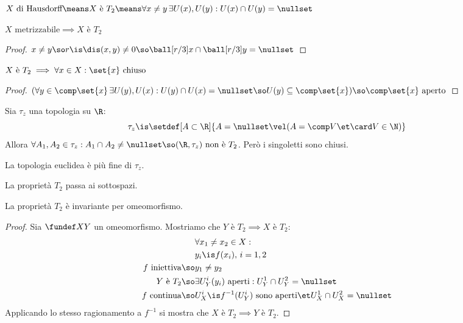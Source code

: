 
\begin{defn}
$X\text{ di Hausdorff}\means X\text{ è }T_2\means\forall x\neq y\,\exists U(x),U(y):U(x)\cap U(y)=\nullset$
\end{defn}

\begin{prop}
$X\text{ metrizzabile}\implies X\text{ è }T_2$
\end{prop}
\begin{proof}
$x\neq y\so r\is\dis(x,y)\neq 0\so\ball[r/3]x\cap\ball[r/3]y=\nullset$
\end{proof}

\begin{prop}
$X\text{ è }T_2\implies\forall x\in X:\set{x}\text{ chiuso}$
\end{prop}
\begin{proof}
$(\forall y\in\comp\set{x}\,\exists U(y),U(x):U(y)\cap U(x)=\nullset\so U(y)\subseteq\comp\set{x})\so\comp\set{x}\text{ aperto}$
\end{proof}

\begin{es}
Sia $\tau_z$ una topologia su $\R$:
\[\tau_z\is\setdef[A\subset\R]{A=\nullset\vel(A=\comp V\et\card V\in\N)}\]
Allora $\forall A_1,A_2\in\tau_z:A_1\cap A_2\neq\nullset\so(\R,\tau_z)\text{ non è }T_2$. Però i singoletti sono chiusi.
\end{es}

\begin{oss}
La topologia euclidea è più fine di $\tau_z$.
\end{oss}

\begin{prop}
La proprietà $T_2$ passa ai sottospazi.
\end{prop}

\begin{prop}
La proprietà $T_2$ è invariante per omeomorfismo.
\end{prop}
\begin{proof}
Sia $\fundef XY$ un omeomorfismo. Mostriamo che $Y\text{ è }T_2\implies X\text{ è }T_2$:
\begin{align*}
&\forall x_1\neq x_2\in X:\\
&y_i\is f(x_i),\,i=1,2\\
f\text{ iniettiva}\so&y_1\neq y_2\\
Y\text{ è }T_2\so&\exists U_Y^i(y_i)\text{ aperti}:U_Y^1\cap U_Y^2=\nullset\\
f\text{ continua}\so&U_X^i\is f^{-1}(U_Y^i)\text{ sono aperti}\et U_X^1\cap U_X^2=\nullset
\end{align*}
Applicando lo stesso ragionamento a $f^{-1}$ si mostra che $X\text{ è }T_2\implies Y\text{ è }T_2$.
\end{proof}

